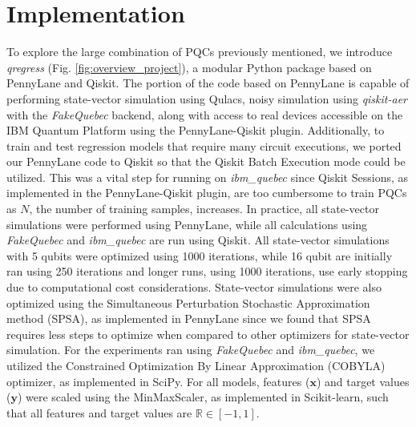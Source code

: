\documentclass[journal=jacsat,manuscript=article]{achemso}
\begin{document}
\section{Implementation}
To explore the large combination of PQCs previously mentioned, we introduce \textit{qregress} (Fig. \ref{fig:overview_project}), a modular Python package based on PennyLane\cite{bergholm_pennylane_2022} and Qiskit\cite{javadi-abhari_quantum_2024}.
The portion of the code based on PennyLane is capable of performing state-vector simulation using Qulacs\cite{suzuki_qulacs_2021}, noisy simulation using \textit{qiskit-aer} with the \textit{FakeQuebec} backend, along with access to real devices accessible on the IBM Quantum Platform using the PennyLane-Qiskit plugin.
Additionally, to train and test regression models that require many circuit executions, we ported our PennyLane code to Qiskit so that the Qiskit Batch Execution mode could be utilized.
This was a vital step for running on \textit{ibm\_quebec} since Qiskit Sessions, as implemented in the PennyLane-Qiskit plugin, are too cumbersome to train PQCs as $N$, the number of training samples, increases.
In practice, all state-vector simulations were performed using PennyLane, while all calculations using \textit{FakeQuebec} and \textit{ibm\_quebec}  are run using Qiskit.
All state-vector simulations with 5 qubits were optimized using 1000 iterations, while 16 qubit are initially ran using 250 iterations and longer runs, using 1000 iterations, use early stopping due to computational cost considerations.
State-vector simulations were also optimized using the Simultaneous Perturbation Stochastic Approximation method (SPSA), as implemented in PennyLane since we found that SPSA requires less steps to optimize when compared to other optimizers for state-vector simulation. 
For the experiments ran using \textit{FakeQuebec} and  \textit{ibm\_quebec}, we utilized the Constrained Optimization By Linear Approximation (COBYLA) optimizer, as implemented in SciPy\cite{virtanen_scipy_2020}.
For all models, features ($\mathbf{x}$) and target values ($\mathbf{y}$) were scaled using the MinMaxScaler, as implemented in Scikit-learn\cite{pedregosa_scikit-learn_2011}, such that all features and target values are $\mathbb{R}\in [ -1,1 ]$.
\end{document}
